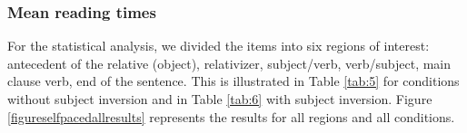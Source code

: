 \documentclass[output=paper]{langscibook}
\begin{document}
\subsubsection{Mean reading times}
For the statistical analysis, we divided the items into six regions of interest: antecedent of the relative (object), relativizer, subject/verb, verb/subject, main clause verb, end of the sentence. This is illustrated in Table \ref{tab:5} for conditions without subject inversion and in Table \ref{tab:6} with subject inversion. Figure \ref{figureselfpacedallresults} represents the results for all regions and all conditions. 


\begin{table}[H]


 
 \caption{Regions without subject inversion}
 \label{tab:5}
\end{table}


\begin{table}[H]


 
 \caption{Regions with subject inversion}
 \label{tab:6}
\end{table}


\end{document}
